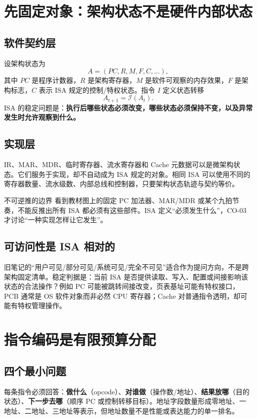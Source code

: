 \documentclass[UTF8,fontset=fandol,11pt,a4paper]{ctexart}
\newcommand{\kw}[1]{\textbf{\color{deep}#1}}
\begin{document}
\section{先固定对象：架构状态不是硬件内部状态}

\subsection{软件契约层}
设架构状态为
\[
A=(PC,R,M,F,C,\ldots),
\]
其中 $PC$ 是程序计数器，$R$ 是架构寄存器，$M$ 是软件可观察的内存效果，$F$ 是架构标志，$C$ 表示 ISA 规定的控制/特权状态。指令 $I$ 定义状态转移
\[
A_{t+1}=\mathcal I(A_t).
\]
ISA 的稳定问题是：\kw{执行后哪些状态必须改变，哪些状态必须保持不变，以及异常发生时允许观察到什么。}

\subsection{实现层}
IR、MAR、MDR、临时寄存器、流水寄存器和 Cache 元数据可以是微架构状态。它们服务于实现，却不自动成为 ISA 规定的对象。相同 ISA 可以使用不同的寄存器数量、流水级数、内部总线和控制器，只要架构状态轨迹与契约等价。

\begin{warnbox}{不可逆推的边界}
看到教材图上的固定 PC 加法器、MAR/MDR 或某个九拍节奏，不能反推出所有 ISA 都必须有这些部件。ISA 定义“必须发生什么”，CO-03 才讨论“一种实现怎样让它发生”。
\end{warnbox}

\subsection{可访问性是 ISA 相对的}
旧笔记的“用户可见/部分可见/系统可见/完全不可见”适合作为提问方向，不是跨架构固定清单。稳定判据是：当前 ISA 是否提供读取、写入、配置或间接影响该状态的合法操作？例如 PC 可能被跳转间接改变，页表基址可能有特权接口，PCB 通常是 OS 软件对象而非必然 CPU 寄存器；Cache 对普通指令透明，却可能有特权管理操作。

\section{指令编码是有限预算分配}

\subsection{四个最小问题}
每条指令必须回答：\kw{做什么}（opcode）、\kw{对谁做}（操作数/地址）、\kw{结果放哪}（目的状态）、\kw{下一步去哪}（顺序 PC 或控制转移目标）。地址字段数量形成零地址、一地址、二地址、三地址等表示，但地址数量不是性能或表达能力的单一排名。
\end{document}
